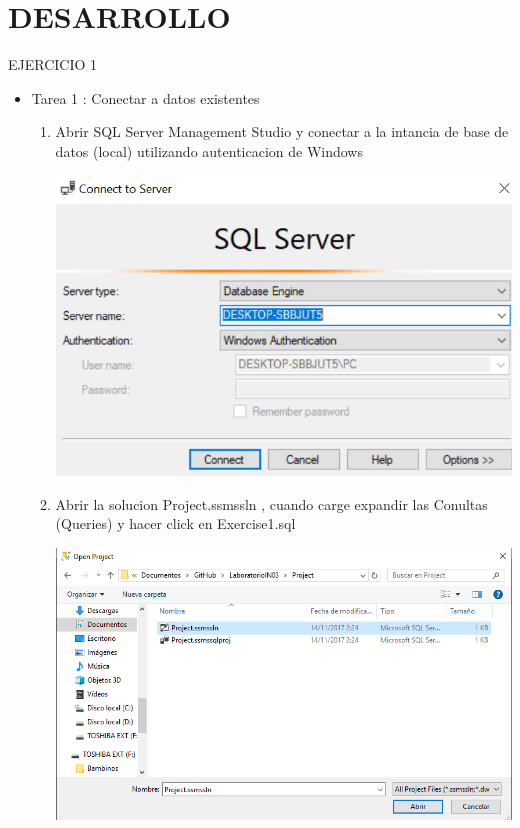 \section{DESARROLLO} 


 EJERCICIO 1

\begin{itemize}
\item Tarea 1 : Conectar a datos existentes


\begin{enumerate}
\item Abrir SQL Server Management Studio y conectar a la intancia de base de datos (local) utilizando autenticacion de Windows 

\begin{center}
\includegraphics[scale=0.55]{./Imagenes/1.png}
\end{center}

\item Abrir la solucion Project.ssmssln , cuando carge expandir las Conultas (Queries) y hacer click en Exercise1.sql

\begin{center}
\includegraphics[scale=0.55]{./Imagenes/2.png}
\end{center}


\end{enumerate}
\end{itemize}

